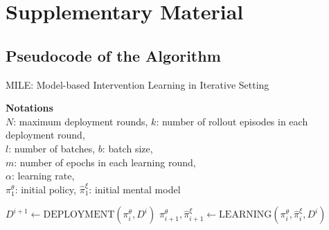 \section*{Supplementary Material}

\subsection{Pseudocode of the Algorithm}
    \vspace{-5px}
    \begin{algorithm}
    \algrenewcommand\algorithmicindent{0.75em}%
    \small
    \caption{MILE: Model-based Intervention Learning in Iterative Setting}
    \label{algo:iterative_pseudocode}
    \noindent
    \begin{minipage}[c]{0.45\linewidth}
    \begin{algorithmic}
    \vspace{-32px}
    \State \textbf{Notations} \\
    $N$: maximum deployment rounds, $k$: number of rollout episodes in each deployment round, \\
    $l$: number of batches, $b$: batch size,\\
    $m$: number of epochs in each learning round, \\
    $\alpha$: learning rate, \\ 
    $\pi^{\theta}_{1}$: initial policy, $\hat{\pi}^{\xi}_{1}$: initial mental model
    
    \vspace{0.3cm}
        \State $D^{i+1} \gets \text{DEPLOYMENT}(\pi^{\theta}_i, D^i)$
        \State $\pi^{\theta}_{i+1}, \hat{\pi}^{\xi}_{i+1} \gets \text{LEARNING}(\pi^{\theta}_i, \hat{\pi}^{\xi}_{i}, D^i)$
    \EndFor
    
    \end{algorithmic}


\end{minipage}
\end{algorithm}
